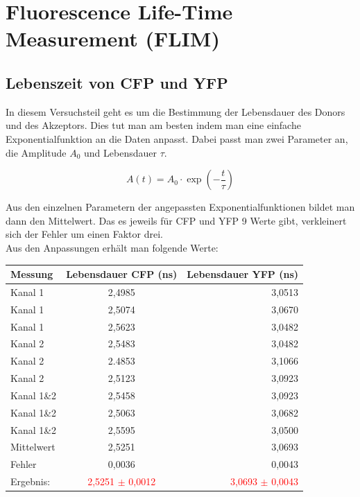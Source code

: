 \section{Fluorescence Life-Time Measurement (FLIM)}

\subsection{Lebenszeit von CFP und YFP}

In diesem Versuchsteil geht es um die Bestimmung der Lebensdauer des Donors und des Akzeptors. Dies tut man am 
besten indem man eine einfache Exponentialfunktion an die Daten anpasst. Dabei passt man zwei Parameter an, die Amplitude $A_0$ und 
Lebensdauer $\tau$.

\begin{equation}
    A(t) = A_0 \cdot \exp(-\frac{t}{\tau})
\end{equation}

Aus den einzelnen Parametern der angepassten Exponentialfunktionen bildet man dann den Mittelwert. Das es jeweils für CFP und YFP 9 Werte gibt, 
verkleinert sich der Fehler um einen Faktor drei.\\
Aus den Anpassungen erhält man folgende Werte:\\

\begin{center}
    \centering
    \begin{tabular}{l|cr}
        \toprule
        Messung & Lebensdauer CFP (ns)& Lebensdauer YFP (ns)\\
        \midrule
        Kanal 1 & 2,4985& 3,0513\\
        Kanal 1 & 2,5074& 3,0670\\
        Kanal 1 & 2,5623& 3,0482\\
        \midrule
        Kanal 2 & 2,5483& 3,0482\\
        Kanal 2 & 2.4853& 3,1066\\
        Kanal 2 & 2,5123& 3,0923\\
        \midrule
        Kanal 1\&2 & 2,5458& 3,0923\\
        Kanal 1\&2 & 2,5063& 3,0682\\
        Kanal 1\&2 & 2,5595& 3,0500\\
        \midrule
        Mittelwert & 2,5251& 3,0693\\
        Fehler& 0,0036& 0,0043\\
        Ergebnis:& \textcolor{red}{2,5251 $\pm$ 0,0012}& \textcolor{red}{3,0693 $\pm$ 0,0043}\\
        \bottomrule
    \end{tabular}
\end{center}

